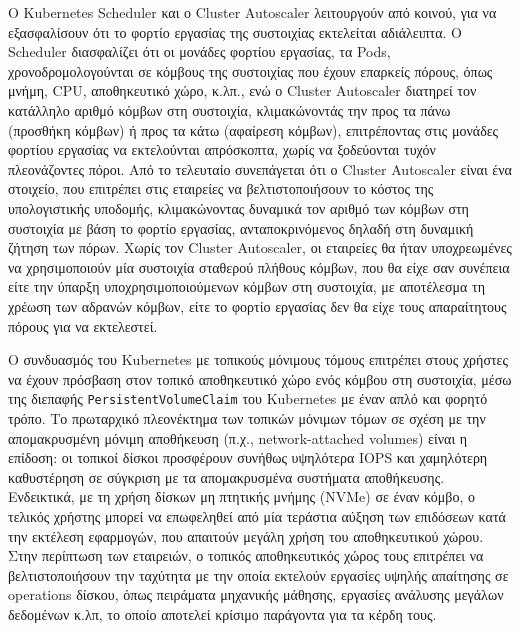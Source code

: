 Ο Kubernetes Scheduler και ο Cluster Autoscaler λειτουργούν από κοινού, για να
εξασφαλίσουν ότι το φορτίο εργασίας της συστοιχίας εκτελείται αδιάλειπτα. Ο
Scheduler διασφαλίζει ότι οι μονάδες φορτίου εργασίας, τα Pods,
χρονοδρομολογούνται σε κόμβους της συστοιχίας που έχουν επαρκείς πόρους, όπως
μνήμη, CPU, αποθηκευτικό χώρο, κ.λπ., ενώ ο Cluster Autoscaler διατηρεί τον
κατάλληλο αριθμό κόμβων στη συστοιχία, κλιμακώνοντάς την προς τα πάνω (προσθήκη
κόμβων) ή προς τα κάτω (αφαίρεση κόμβων), επιτρέποντας στις μονάδες φορτίου
εργασίας να εκτελούνται απρόσκοπτα, χωρίς να ξοδεύονται τυχόν πλεονάζοντες
πόροι.  Από το τελευταίο συνεπάγεται ότι ο Cluster Autoscaler είναι ένα
στοιχείο, που επιτρέπει στις εταιρείες να βελτιστοποιήσουν το κόστος της
υπολογιστικής υποδομής, κλιμακώνοντας δυναμικά τον αριθμό των κόμβων στη
συστοιχία με βάση το φορτίο εργασίας, ανταποκρινόμενος δηλαδή στη δυναμική
ζήτηση των πόρων. Χωρίς τον Cluster Autoscaler, οι εταιρείες θα ήταν
υποχρεωμένες να χρησιμοποιούν μία συστοιχία σταθερού πλήθους κόμβων, που θα είχε
σαν συνέπεια είτε την ύπαρξη υποχρησιμοποιούμενων κόμβων στη συστοιχία, με
αποτέλεσμα τη χρέωση των αδρανών κόμβων, είτε το φορτίο εργασίας δεν θα είχε
τους απαραίτητους πόρους για να εκτελεστεί.

Ο συνδυασμός του Kubernetes με τοπικούς μόνιμους τόμους επιτρέπει στους χρήστες
να έχουν πρόσβαση στον τοπικό αποθηκευτικό χώρο ενός κόμβου στη συστοιχία, μέσω
της διεπαφής \texttt{PersistentVolumeClaim} του Kubernetes με έναν απλό και φορητό
τρόπο. Το πρωταρχικό πλεονέκτημα των τοπικών μόνιμων τόμων σε σχέση με την
απομακρυσμένη μόνιμη αποθήκευση (π.χ., network-attached volumes) είναι η
επίδοση: οι τοπικοί δίσκοι προσφέρουν συνήθως υψηλότερα IOPS και
χαμηλότερη καθυστέρηση σε σύγκριση με τα απομακρυσμένα συστήματα αποθήκευσης.
Ενδεικτικά, με τη χρήση δίσκων μη πτητικής μνήμης (NVMe) σε έναν κόμβο, ο
τελικός χρήστης μπορεί να επωφεληθεί από μία τεράστια αύξηση των επιδόσεων κατά
την εκτέλεση εφαρμογών, που απαιτούν μεγάλη χρήση του αποθηκευτικού χώρου. Στην
περίπτωση των εταιρειών, ο τοπικός αποθηκευτικός χώρος τους επιτρέπει
να βελτιστοποιήσουν την ταχύτητα με την οποία εκτελούν εργασίες υψηλής απαίτησης
σε operations δίσκου, όπως πειράματα μηχανικής μάθησης, εργασίες ανάλυσης μεγάλων
δεδομένων κ.λπ, το οποίο αποτελεί κρίσιμο παράγοντα για τα κέρδη τους.

